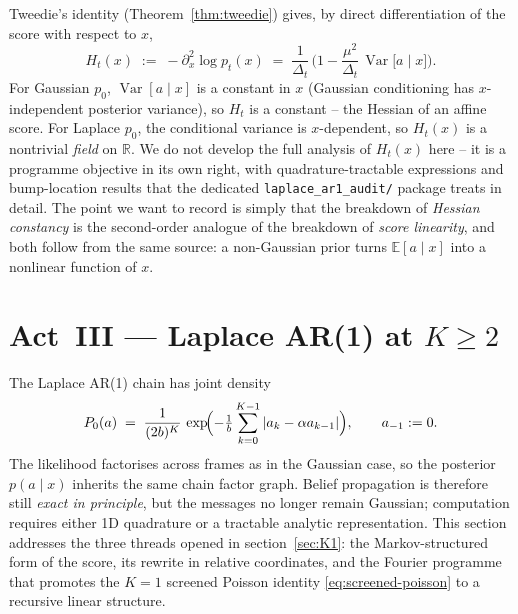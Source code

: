 \documentclass[11pt]{article}
\theoremstyle{definition}
\newcommand{\R}{\mathbb{R}}
\newcommand{\E}{\mathbb{E}}
\newcommand{\Var}{\operatorname{Var}}
\newcommand{\Detl}{\Delta_t}
\begin{document}
Tweedie's identity (Theorem~\ref{thm:tweedie}) gives, by direct
differentiation of the score with respect to \(x\),
\begin{equation}\label{eq:H-tweedie}
    H_t(x) \;:=\; - \partial_x^2 \log p_t(x)
            \;=\; \frac{1}{\Detl}\, \biggl(1
                  - \frac{\mu^2}{\Detl}\, \Var\!\bigl[a \mid x\bigr]\biggr).
\end{equation}
For Gaussian \(p_0\), \(\Var[a \mid x]\) is a constant in \(x\)
(Gaussian conditioning has \(x\)-independent posterior variance), so
\(H_t\) is a constant -- the Hessian of an affine score. For Laplace
\(p_0\), the conditional variance is \(x\)-dependent, so \(H_t(x)\) is
a nontrivial \emph{field} on \(\R\). We do not develop the full
analysis of \(H_t(x)\) here -- it is a programme objective in its own
right, with quadrature-tractable expressions and bump-location
results that the dedicated \texttt{laplace\_ar1\_audit/} package
treats in detail. The point we want to record is simply that the
breakdown of \emph{Hessian constancy} is the second-order analogue of
the breakdown of \emph{score linearity}, and both follow from the
same source: a non-Gaussian prior turns
\(\E[a \mid x]\) into a nonlinear function of \(x\).

\section{Act~III --- Laplace AR(1) at \(K \geq 2\)}\label{sec:K2}

The Laplace AR(1) chain has joint density
\begin{equation}
    P_0(a) \;=\; \frac{1}{(2 b)^K}\,
        \exp\!\Bigl(-\tfrac{1}{b}\sum_{k=0}^{K-1} |a_k - \alpha a_{k-1}|\Bigr),
    \qquad a_{-1} := 0.
\end{equation}
The likelihood factorises across frames as in the Gaussian case, so
the posterior \(p(a \mid x)\) inherits the same chain factor graph.
Belief propagation is therefore still \emph{exact in principle}, but
the messages no longer remain Gaussian; computation requires either
1D quadrature or a tractable analytic representation. This section
addresses the three threads opened in section~\ref{sec:K1}: the
Markov-structured form of the score, its rewrite in relative
coordinates, and the Fourier programme that promotes the \(K = 1\)
screened Poisson identity \eqref{eq:screened-poisson} to a
recursive linear structure.
\end{document}

